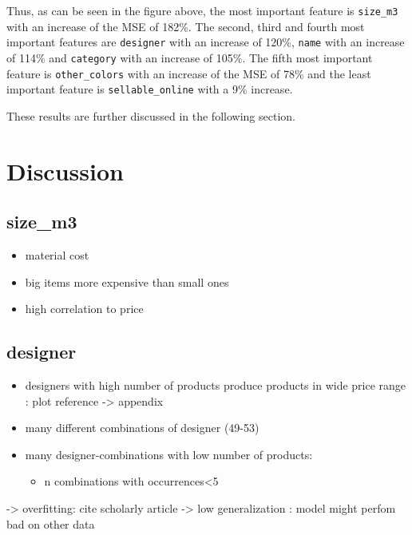 \documentclass[a4paper, nobind]{templates/ociamthesis}
\providecommand{\tightlist}{%
  \setlength{\itemsep}{0pt}\setlength{\parskip}{0pt}}
\begin{document}
Thus, as can be seen in the figure above, the most important feature is \texttt{size\_m3} with an increase of the MSE of 182\%. The second, third and fourth most important features are \texttt{designer} with an increase of 120\%, \texttt{name} with an increase of 114\% and \texttt{category} with an increase of 105\%. The fifth most important feature is \texttt{other\_colors} with an increase of the MSE of 78\% and the least important feature is \texttt{sellable\_online} with a 9\% increase.

These results are further discussed in the following section.

\hypertarget{discussion}{%
\chapter{Discussion}\label{discussion}}

\hypertarget{size_m3}{%
\section{size\_m3}\label{size_m3}}

\begin{itemize}
\tightlist
\item
  material cost
\item
  big items more expensive than small ones
\item
  high correlation to price
\end{itemize}

\hypertarget{designer}{%
\section{designer}\label{designer}}

\begin{itemize}
\item
  designers with high number of products produce products in wide price range : plot reference -\textgreater{} appendix
\item
  many different combinations of designer (49-53)
\item
  many designer-combinations with low number of products:

  \begin{itemize}
  \tightlist
  \item
    n combinations with occurrences\textless{}5
  \end{itemize}
\end{itemize}

-\textgreater{} overfitting: cite scholarly article
-\textgreater{} low generalization : model might perfom bad on other data
\end{document}
